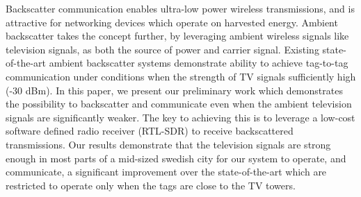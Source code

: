 Backscatter communication enables ultra-low
power wireless transmissions, and is attractive
for networking devices which operate 
on harvested energy. Ambient backscatter
takes the concept further, by leveraging
ambient wireless signals like
television signals, as both the source of power
and carrier signal. Existing state-of-the-art ambient backscatter
systems demonstrate ability to achieve tag-to-tag communication 
under conditions when the
strength of TV signals  sufficiently high (-30 dBm).  In this paper, we present our preliminary work
which demonstrates the possibility to backscatter and communicate even when the ambient television signals
are significantly weaker. The key to achieving this is to leverage a low-cost
software defined radio receiver (RTL-SDR) to receive backscattered transmissions. Our results 
demonstrate that the  television signals are strong 
enough in most parts of a mid-sized swedish city for our system
to operate, and communicate, a significant improvement over the
state-of-the-art which are
restricted to operate only when the tags are close to the TV towers.
